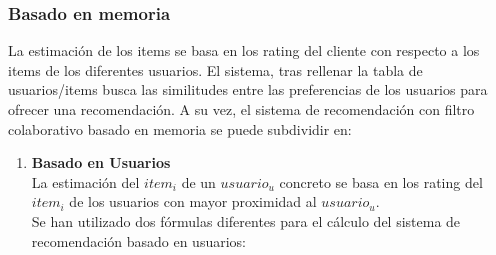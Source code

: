 \subsubsection{Basado en memoria}
La estimación de los items se basa en los rating del cliente con respecto a los items de los diferentes usuarios. El sistema, tras rellenar la tabla de usuarios/items busca las similitudes entre las preferencias de los usuarios para ofrecer una recomendación. 
A su vez, el sistema de recomendación con filtro colaborativo basado en memoria se puede subdividir en: 
\begin{enumerate}

\item  \textbf{Basado en Usuarios}\\ La estimación del  $item_{i}$ de un $usuario_{u}$ concreto se basa en los rating del $item_{i}$  de los usuarios  con mayor proximidad al $usuario_{u}$. \\Se han utilizado dos fórmulas diferentes para el cálculo del sistema de recomendación basado en usuarios: \\ \begin{itemize}


\end{itemize}
\end{enumerate}
